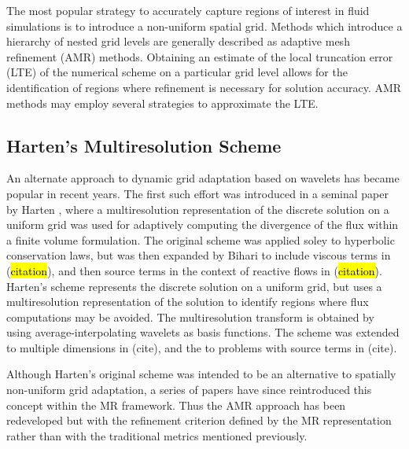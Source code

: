 \documentclass{article}
\begin{document}
    The most popular strategy to accurately capture regions of interest in fluid
    simulations is to introduce a non-uniform spatial grid.  Methods which
    introduce a hierarchy of nested grid levels are generally described as
    adaptive mesh refinement (AMR) methods. Obtaining an estimate of the local
    truncation error (LTE) of the numerical scheme on a particular grid
    level allows for the identification of regions where refinement is necessary
    for solution accuracy. AMR methods may employ several strategies to
    approximate the LTE. 


    \subsection*{Harten's Multiresolution Scheme}

        An alternate approach to dynamic grid adaptation based on wavelets has became
        popular in recent years. The first such effort was introduced in a seminal
        paper by Harten \cite{harten1994}, where a multiresolution representation of
        the discrete solution on a uniform grid was used for adaptively computing the
        divergence of the flux within a finite volume formulation. The original
        scheme was applied soley to hyperbolic conservation laws, but was then
        expanded by Bihari to include viscous terms in (\hl{citation}), and then source
        terms in the context of reactive flows in (\hl{citation}). Harten's scheme
        represents the discrete solution on a uniform grid, but uses a
        multiresolution representation of the solution to identify regions where
        flux computations may be avoided. The multiresolution transform is obtained
        by using average-interpolating wavelets as basis functions. The scheme was
        extended to multiple dimensions in (cite), and the to problems with source
        terms in (cite).

        Although Harten's original scheme was intended to be an alternative to
        spatially non-uniform grid adaptation, a series of papers have
        since reintroduced this concept within the MR framework. Thus the AMR
        approach has been redeveloped but with the refinement criterion defined by
        the MR representation rather than with the traditional metrics mentioned
        previously.
\end{document}

